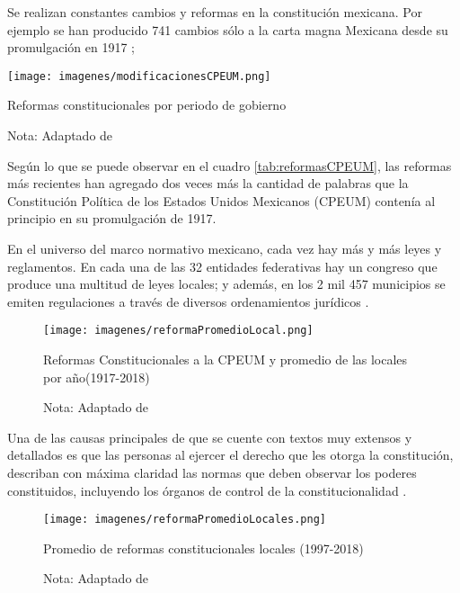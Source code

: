 \documentclass[12pt]{article}
\begin{document}
		Se realizan constantes cambios y reformas en la constitución mexicana. Por ejemplo se han producido 741 cambios sólo a la carta magna Mexicana desde su promulgación en 1917 \cite{CAMACHO2020};
		
		\begin{table}[H]
			\texttt{[image: imagenes/modificacionesCPEUM.png]}
			\centering
			\caption{Reformas constitucionales por periodo de gobierno}
			\caption*{\small  Nota: Adaptado de \cite{Fix-Fierro2017}}
			\label{tab:reformasCPEUM}
		\end{table}
		
		Según lo que se puede observar en el cuadro \ref{tab:reformasCPEUM}, las reformas más recientes han agregado dos veces más la cantidad de palabras que la Constitución Política de los Estados Unidos Mexicanos (CPEUM) contenía al principio en su promulgación de 1917.\cite{Fix-Fierro2017}
		
		En el universo del marco normativo mexicano, cada vez hay más y más leyes y reglamentos. En cada una de las 32 entidades federativas hay un congreso que produce una multitud de leyes locales; y además, en los 2 mil 457 municipios se emiten regulaciones a través de diversos ordenamientos jurídicos \cite{BUSTAMANTE2019}.
		
		\begin{figure}[H]
		\texttt{[image: imagenes/reformaPromedioLocal.png]}
		\centering
		\caption{Reformas Constitucionales a la CPEUM y promedio de las locales por año(1917-2018)}
		\caption*{\small Nota: Adaptado de \cite{Gallardo2020}}
		\label{fig:promedioLocalXaño}
		\end{figure}
		
		
		Una de las causas principales de que se cuente con textos muy extensos y detallados es que 
		las personas al ejercer el derecho que les otorga la constitución, describan con máxima  claridad las normas que deben observar los poderes constituidos, incluyendo los órganos de control de la constitucionalidad \cite{Fix-Fierro2017}.
		
		\begin{figure}[H]
			\texttt{[image: imagenes/reformaPromedioLocales.png]}
			\centering
			\caption{Promedio de reformas constitucionales locales (1997-2018)}
			\caption*{\small Nota: Adaptado de  \cite{Gallardo2020}}
			\label{fig:promedioLocal}
		\end{figure}
		
\end{document}
